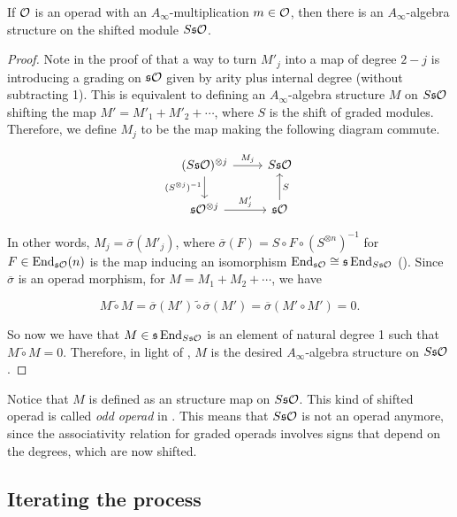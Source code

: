 \documentclass[Thesis.tex]{subfiles}
\begin{document}
\begin{propo}\label{ainftystructure}
If ${\mathcal O}$ is an operad with an $A_\infty$-multiplication $m\in{\mathcal O}$, then there is an $A_\infty$-algebra structure on the shifted module $S\mathfrak{s}{\mathcal O}$. 
\end{propo}
\begin{proof}
Note in the proof of  that a way to turn $M'_j$ into a map of degree $2-j$ is introducing a grading on $\mathfrak{s}{\mathcal O}$ given by arity plus internal degree (without subtracting 1). This is equivalent to defining an $A_\infty$-algebra structure $M$ on $S\mathfrak{s}{\mathcal O}$ shifting the map $M'=M'_1+M'_2+\cdots$, where $S$ is the shift of graded modules. Therefore, we define $M_j$ to be the map making the following diagram commute.

\[
\begin{tikzcd}
(S\s\OO)^{\otimes j}\arrow[r,"M_j"]\arrow[d, "(S^{\otimes j})^{-1}"'] & S\s\OO\\
\s\OO^{\otimes j}\arrow[r, "M'_j"] & \s\OO\arrow[u,"S"']
\end{tikzcd}
\]

In other words, $M_j=\overline{\sigma}(M'_j)$, where $\overline{\sigma}(F)=S\circ F\circ (S^{\otimes n})^{-1}$ for $F\in\operatorname{End}_{\mathfrak{s}{\mathcal O}}(n)$ is the map inducing an isomorphism $\operatorname{End}_{\mathfrak{s}{\mathcal O}}\cong \mathfrak{s}\operatorname{End}_{S\mathfrak{s}{\mathcal O}}$ (). Since $\overline{\sigma}$ is an operad morphism, for $M=M_1+M_2+\cdots$, we have

\[
M\tilde{\circ}M=\overline{\sigma}(M')\tilde{\circ}\overline{\sigma}(M')=\overline{\sigma}(M'\circ M')=0.
\]

So now we have that $M\in\mathfrak{s}\operatorname{End}_{S\mathfrak{s}{\mathcal O}}$ is an element of natural degree 1 such that $M\tilde\circ M=0$. Therefore, in light of , $M$ is the desired $A_\infty$-algebra structure on $S\mathfrak{s}{\mathcal O}$. 
\end{proof}
Notice that $M$ is defined as an structure map on $S\mathfrak{s}{\mathcal O}$. This kind of shifted operad is called \emph{odd operad} in \cite{ward}. This means that $S\mathfrak{s}{\mathcal O}$ is not an operad anymore, since the associativity relation for graded operads involves signs that depend on the degrees, which are now shifted. 

\subsection{Iterating the process}\label{sect3}
\end{document}
